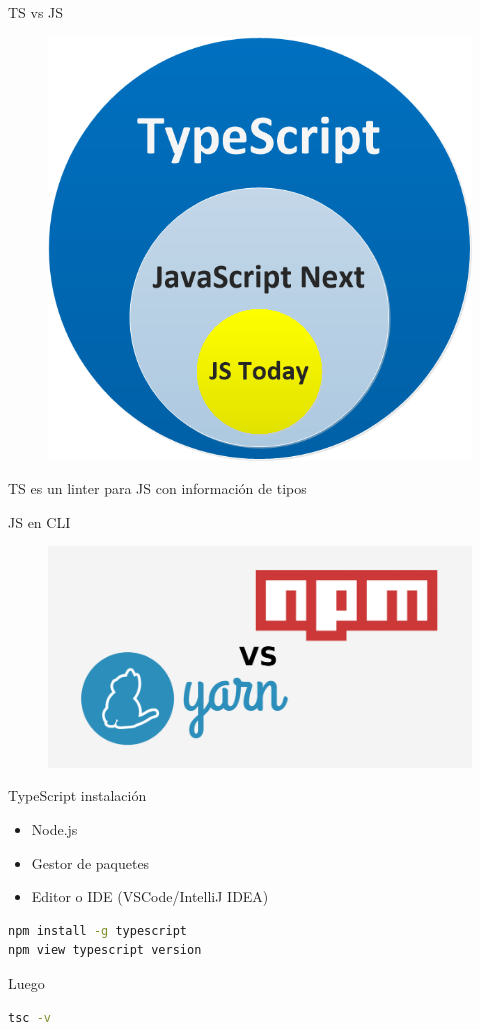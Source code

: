 \documentclass[aspectratio=169]{beamer}
\begin{document}
\begin{frame}{TS vs JS}
    \begin{figure}
        \centering
        \includegraphics[width=0.5\linewidth]{Images/venn.png}
        \label{fig:requestresponse}
    \end{figure}
    TS es un linter para JS con información de tipos
\end{frame}




\begin{frame}{JS en CLI}
\begin{figure}
	\centering
	\includegraphics[width=0.8\linewidth]{Images/npmyarn}
\end{figure}
\end{frame}

\begin{frame}[fragile]{TypeScript instalación}
\begin{itemize}
	\item Node.js
	\item Gestor de paquetes
	\item Editor o IDE (VSCode/IntelliJ IDEA)
\end{itemize}

\begin{lstlisting}[language=bash]
npm install -g typescript
npm view typescript version
\end{lstlisting}
Luego
\begin{lstlisting}[language=bash]
tsc -v
\end{lstlisting}
\end{frame}
\end{document}
